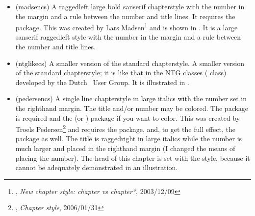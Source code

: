 \begin{itemize}


\item[\cstyle{madsen}]
\glossary(madsencs)%
  {}%
  {A raggedleft large bold sanserif chapterstyle with the number in the
   margin and a rule between the number and title lines.
   It requires the  package.}
  This was created by
  Lars Madsen\footnote{\ctt,
  \textit{New chapter style: chapter vs chapter*}, 2003/12/09}
  and is shown in .
  It is a large sanserif raggedleft style with the number in the margin
  and a rule between the number and title lines.



\item[\cstyle{ntglike}]
\glossary(ntglikecs)%
  {}%
  { A smaller version of the standard chapterstyle.}
A smaller version of the standard chapterstyle; it is like that in the NTG
classes ( class) developed by the Dutch \tx\ User Group.
It is illustrated in
.




\item[\cstyle{pedersen}]
\glossary(pedersencs)%
  {}%
  {A single line chapterstyle in large italics with the number set in the
  righthand margin. The title and/or number may be colored. The
   package is required and the 
  (or ) package if you want to color.}
  This was created by
  Troels Pedersen\footnote{\ctt,
  \textit{Chapter style}, 2006/01/31} and requires the 
  package, and, to get the full effect, the  package as well.
  The title is raggedright in large italics while the number is much larger
  and placed in the righthand margin (I changed the means of placing the
  number). The head of this chapter is set with the  style,
  because it cannot be adequately demonstrated in an illustration.


\end{itemize}
